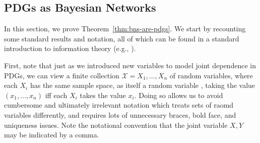 \documentclass{article}
\theoremstyle{plain}
\theoremstyle{definition}
\theoremstyle{remark}
\newcommand{\V}{\mathcal V}
\numberwithin{equation}{section}
\begin{document}
	\subsection{PDGs as Bayesian Networks}
In this section, we prove Theorem~\ref{thm:bns-are-pdgs}.  
We start by recounting some standard results and notation, all of
which can be found in a standard introduction to information
theory (e.g., \cite[Chapter 1]{mackay2003information}).  

First, note that just as we introduced new variables to model joint dependence
in PDGs, we can view a finite collection $\mathcal X=X_1, \ldots, X_n$ of random
variables, where each $X_i$ has the same sample space, as itself a random
variable%
, taking the value $(x_1, \ldots, x_n)$ iff each $X_i$ takes the value $x_i$.
Doing so allows us to avoid cumbersome and ultimately irrelevant notation which treats sets of raomd variables differently, and requires lots of unnecessary braces, bold face, and uniqueness issues. 
Note the notational convention that the joint variable $X,Y$ may be indicated by a comma.
\end{document}
